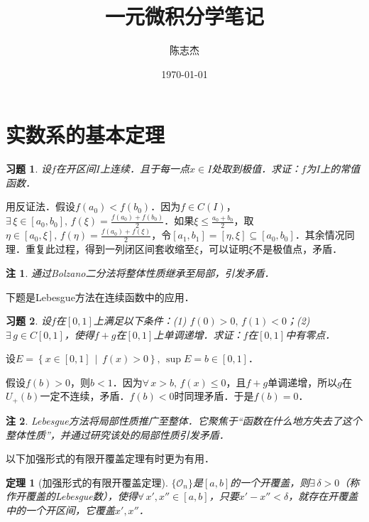 \documentclass[11pt,a4paper]{ctexart}
\title{一元微积分学笔记}
\author{陈志杰}
\date{\today}
\makeatletter
\theoremstyle{thmseries} %
\newtheorem{thm}{定理}[section]
\theoremstyle{exerseries}
\newtheorem{exer}{习题}[section]
\newtheorem*{rem}{注}
\renewenvironment{proof}[1][\proofname]{\par
  \pushQED{\qed}%
  \normalfont \topsep6\p@\@plus6\p@\relax
  \trivlist
  \item[\hskip\labelsep
        \itshape
    #1\@addpunct{}]\ignorespaces
}{%
  \popQED\endtrivlist\@endpefalse
}
\newenvironment{pf}{\begin{proof}[\bfseries\upshape 证\quad]}{\end{proof}}
\newcommand{\cbra}[1]{\mathopen{}\left\{#1\right\}}
\makeatother
\begin{document}
\maketitle
\thispagestyle{empty}
\tableofcontents
\justifying
\newpage


\section{实数系的基本定理}
\begin{exer}
	设$f$在开区间$I$上连续．且于每一点$x\in I$处取到极值．求证：$f$为$I$上的常值函数．
\end{exer}
\begin{pf}
	用反证法．假设$f(a_0)<f(b_0)$．因为$f\in C(I)$，$\exists\,\xi\in[a_0,b_0],\,f(\xi)=\frac{f(a_0)+f(b_0)}{2}$．如果$\xi\leq\frac{a_0+b_0}{2}$，取$\eta\in[a_0,\xi],\,f(\eta)=\frac{f(a_0)+f(\xi)}{2}$，令$[a_1,b_1]=[\eta,\xi]\subseteq[a_0,b_0]$．其余情况同理．重复此过程，得到一列闭区间套收缩至$\xi$，可以证明$\xi$不是极值点，矛盾．
\end{pf}
\begin{rem}
	通过Bolzano二分法将整体性质继承至局部，引发矛盾．
\end{rem}

下题是Lebesgue方法在连续函数中的应用．
\begin{exer}
	设$f$在$[0,1]$上满足以下条件：(1) $f(0)>0,\,f(1)<0$；(2) $\exists\,g\in C[0,1]$，使得$f+g$在$[0,1]$上单调递增．求证：$f$在$[0,1]$中有零点．
\end{exer}
\begin{pf}
	设$E=\cbra{x\in[0,1]\,\middle\vert\,f(x)>0},\,\sup E=b\in[0,1]$．
	
	假设$f(b)>0$，则$b<1$．因为$\forall\,x>b,\,f(x)\leq0$，且$f+g$单调递增，所以$g$在$U_+(b)$一定不连续，矛盾．$f(b)<0$时同理矛盾．于是$f(b)=0$．
\end{pf}
\begin{rem}
	Lebesgue方法将局部性质推广至整体．它聚焦于``函数在什么地方失去了这个整体性质''，并通过研究该处的局部性质引发矛盾．
\end{rem}

以下加强形式的有限开覆盖定理有时更为有用．
\begin{thm}[加强形式的有限开覆盖定理]
	$\{\mathcal{O}_n\}$是$[a,b]$的一个开覆盖，则$\exists\,\delta>0$（称作开覆盖的Lebesgue数），使得$\forall\,x',x''\in[a,b]$，只要$x'-x''<\delta$，就存在开覆盖中的一个开区间，它覆盖$x',x''$．
\end{thm}
\end{document}
